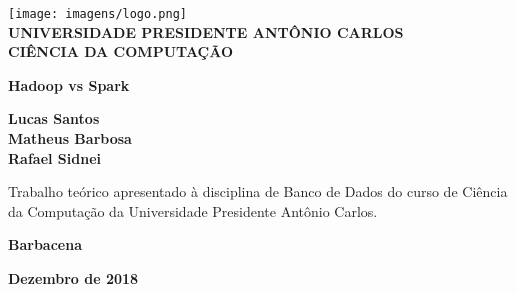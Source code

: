 \documentclass[12pt,a4paper]{article}
\begin{document}
\begin{titlepage}
    \vfill
	\begin{center}
    \texttt{[image: imagens/logo.png]}\\
	\textbf{UNIVERSIDADE PRESIDENTE ANTÔNIO CARLOS \\ [0.05cm]CIÊNCIA DA COMPUTAÇÃO}

	\vspace{0.6cm}
	\vspace{4cm}
	{\huge \textbf{Hadoop vs Spark}}\vspace{8mm}
	
	{\large \textbf{Lucas Santos \\Matheus Barbosa \\[0.1cm]Rafael Sidnei}}\\[3cm]
	
		\hspace{.45\textwidth} %
	   \begin{minipage}{.5\textwidth}
	   Trabalho teórico apresentado à disciplina de Banco de Dados do curso de Ciência da Computação da Universidade Presidente Antônio Carlos.\\[0.1cm]
	  \end{minipage}
	  \vfill
	
	\textbf{Barbacena}
	
	\textbf{Dezembro de 2018}
	\end{center}
	
\end{titlepage}

\newpage
\setcounter{secnumdepth}{5}
\tableofcontents
\newpage





\cite{gu2013memory}
\cite{logz.io}
\cite{quora}
\end{document}
